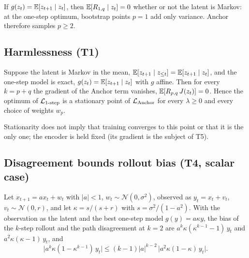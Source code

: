 \begin{remark}
\label{rem:p1}
If $g(z_{t}) = \mathbb{E}[z_{t+1} \mid z_{t}]$, then $\mathbb{E}[R_{1,q} \mid z_{t}] = 0$ whether or not the latent is Markov: at the one-step optimum, bootstrap points $p = 1$ add only variance. Anchor therefore samples $p \ge 2$.
\end{remark}

\subsection{Harmlessness (T1)}

\begin{proposition}
\label{prop:t1}
Suppose the latent is Markov in the mean, $\mathbb{E}[z_{t+1} \mid z_{\le t}] = \mathbb{E}[z_{t+1} \mid z_{t}]$, and the one-step model is exact, $g(z_{t}) = \mathbb{E}[z_{t+1} \mid z_{t}]$ with $g$ affine. Then for every $k = p + q$ the gradient of the Anchor term vanishes, $\mathbb{E}[R_{p,q} \, J(z_{t})] = 0$. Hence the optimum of $\mathcal{L}_{\text{1-step}}$ is a stationary point of $\mathcal{L}_{\text{Anchor}}$ for every $\lambda \ge 0$ and every choice of weights $w_p$.
\end{proposition}

Stationarity does not imply that training converges to this point or that it is the only one; the encoder is held fixed (its gradient is the subject of T5).

\subsection{Disagreement bounds rollout bias (T4, scalar case)}

\begin{proposition}
\label{prop:t4-ar1}
Let $x_{t+1} = a x_t + w_t$ with $|a| < 1$, $w_t \sim \mathcal N(0, \sigma^2)$, observed as $y_t = x_t + v_t$, $v_t \sim \mathcal N(0, r)$, and let $\kappa = s / (s + r)$ with $s = \sigma^2 / (1 - a^2)$. With the observation as the latent and the best one-step model $g(y) = a \kappa y$, the bias of the $k$-step rollout and the path disagreement at $k = 2$ are $a^{k} \kappa (\kappa^{k-1} - 1)\, y_t$ and $a^{2} \kappa (\kappa - 1)\, y_t$, and
\begin{equation}
  \big| a^{k} \kappa (1 - \kappa^{k-1})\, y_t \big| \le (k-1) |a|^{k-2} \, \big| a^{2} \kappa (1 - \kappa)\, y_t \big| .
\end{equation}
\end{proposition}

